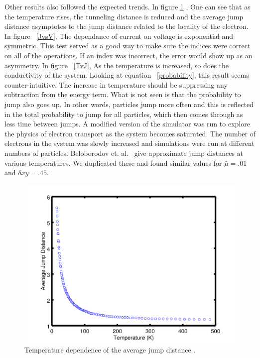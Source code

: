   Other results also followed the expected trends. In figure \ref{TvsRbar} , One can see that as the temperature rises, the tunneling distance is reduced and the average jump distance asymptotes to the jump distance related to the locality of the electron. In figure ~\ref{JvsV}, The dependance of current on voltage is exponential and symmetric. This test served as a good way to make sure the indices were correct on all of the operations. If an index was incorrect, the error would show up as an asymmetry. In figure ~\ref{TvJ}, As the temperature is increased, so does the conductivity of the system. Looking at equation ~\ref{probability}, this result seems counter-intuitive. The increase in temperature should be suppressing any subtraction from the energy term. What is not seen is that the probability to jump also goes up. In other words, particles jump more often and this is reflected in the total probability to jump for all particles, which then comes through as less time between jumps. A modified version of the simulator was run to explore the physics of electron transport as the system becomes saturated. The number of electrons in the system was slowly increased and simulations were run at different numbers of particles. Beloborodov et. al.~\cite{Beloborodov07} give approximate jump distances at various temperatures. We duplicated these and found similar values for $\bar \mu = .01$ and $\delta xy = .45$.


\begin{figure}[htbp]
\begin{center}
\includegraphics[scale=.50]{TvR.png}
\caption{Temperature dependence of the average jump distance .}
\label{TvsRbar}
\end{center}
\end{figure}

